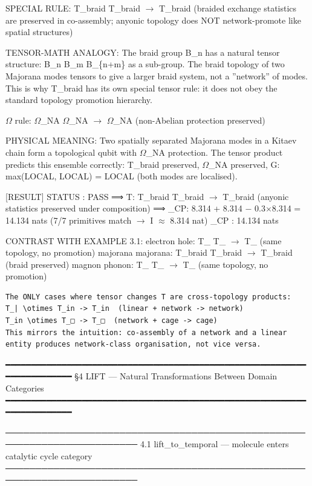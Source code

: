 \documentclass[12pt,a4paper]{article}
\begin{document}
SPECIAL RULE: T\_braid \otimes T\_braid $\rightarrow$ T\_braid
(braided exchange statistics are preserved in co-assembly;
anyonic topology does NOT network-promote like spatial structures)

TENSOR-MATH ANALOGY:
The braid group B\_n has a natural tensor structure: B\_n \otimes B\_m \subseteq B\_\{n+m\}
as a sub-group. The braid topology of two Majorana modes tensors to
give a larger braid system, not a ''network'' of modes.
This is why T\_braid has its own special tensor rule: it does not
obey the standard topology promotion hierarchy.

$\Omega$ rule: $\Omega$\_NA \otimes $\Omega$\_NA $\rightarrow$ $\Omega$\_NA  (non-Abelian protection preserved)

PHYSICAL MEANING:
Two spatially separated Majorana modes in a Kitaev chain form a
topological qubit with $\Omega$\_NA protection. The tensor product predicts
this ensemble correctly: T\_braid preserved, $\Omega$\_NA preserved,
G: max(LOCAL, LOCAL) = LOCAL (both modes are localised).

{[}RESULT{]}
STATUS  : PASS
⟹  T: T\_braid \otimes T\_braid $\rightarrow$ T\_braid (anyonic statistics preserved under composition)
⟹  \xi\_CP: 8.314 + 8.314 $-$ 0.3$\times$8.314 = 14.134 nats (7/7 primitives match $\rightarrow$ I $\approx$ 8.314 nat)
\xi\_CP    : 14.134 nats

CONTRAST WITH EXAMPLE 3.1:
electron \otimes hole: T\_\textbar{} \otimes T\_\textbar{} $\rightarrow$ T\_\textbar{} (same topology, no promotion)
majorana \otimes majorana: T\_braid \otimes T\_braid $\rightarrow$ T\_braid (braid preserved)
magnon \otimes phonon: T\_\textbar{} \otimes T\_\textbar{} $\rightarrow$ T\_\textbar{} (same topology, no promotion)

\begin{lstlisting}
The ONLY cases where tensor changes T are cross-topology products:
T_| \otimes T_in -> T_in  (linear + network -> network)
T_in \otimes T_□ -> T_□  (network + cage -> cage)
This mirrors the intuition: co-assembly of a network and a linear
entity produces network-class organisation, not vice versa.
\end{lstlisting}

━━━━━━━━━━━━━━━━━━━━━━━━━━━━━━━━━━━━━━━━━━━━━━━━━━━━━━━━━━━━━━━━━━━━━━━━
§4  LIFT  ---  Natural Transformations Between Domain Categories
━━━━━━━━━━━━━━━━━━━━━━━━━━━━━━━━━━━━━━━━━━━━━━━━━━━━━━━━━━━━━━━━━━━━━━━━

────────────────────────────────────────────────────────────────────────
4.1  lift\_to\_temporal --- molecule enters catalytic cycle category
────────────────────────────────────────────────────────────────────────
\end{document}
